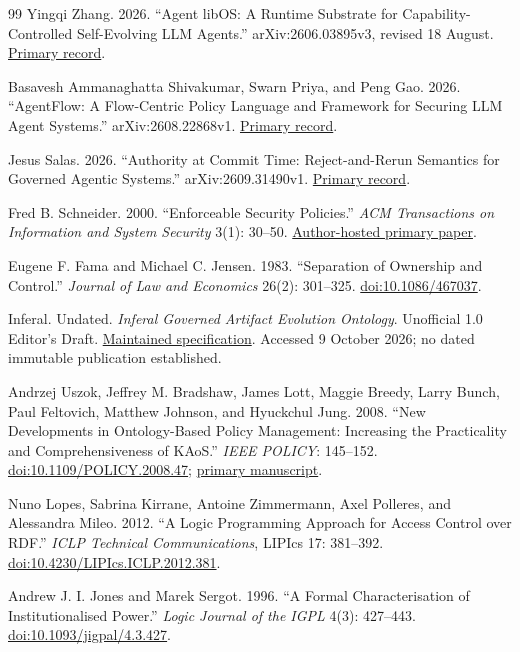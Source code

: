 \documentclass[
  english,
  12pt,
  a4paper,
  preprint,
  numbers,
  nopreprintline]{elsarticle}
\begin{document}
\begin{thebibliography}{99}
Yingqi Zhang. 2026. ``Agent libOS: A Runtime Substrate for
Capability-Controlled Self-Evolving LLM Agents.'' arXiv:2606.03895v3,
revised 18 August. \href{https://arxiv.org/abs/2606.03895v3}{Primary
record}.

Basavesh Ammanaghatta Shivakumar, Swarn Priya, and Peng Gao. 2026.
``AgentFlow: A Flow-Centric Policy Language and Framework for Securing
LLM Agent Systems.'' arXiv:2608.22868v1.
\href{https://arxiv.org/abs/2608.22868v1}{Primary record}.

Jesus Salas. 2026. ``Authority at Commit Time: Reject-and-Rerun
Semantics for Governed Agentic Systems.'' arXiv:2609.31490v1.
\href{https://arxiv.org/abs/2609.31490v1}{Primary record}.

Fred B. Schneider. 2000. ``Enforceable Security Policies.'' \emph{ACM
Transactions on Information and System Security} 3(1): 30--50.
\href{https://www.cs.cornell.edu/fbs/publications/EnfSecPols.pdf}{Author-hosted
primary paper}.

Eugene F. Fama and Michael C. Jensen. 1983. ``Separation of Ownership
and Control.'' \emph{Journal of Law and Economics} 26(2): 301--325.
\href{https://doi.org/10.1086/467037}{doi:10.1086/467037}.

Inferal. Undated. \emph{Inferal Governed Artifact Evolution Ontology}.
Unofficial 1.0 Editor's Draft.
\href{https://ontology.inferal.com/modules/artifact-evolution/spec/}{Maintained
specification}. Accessed 9 October 2026; no dated immutable publication
established.

Andrzej Uszok, Jeffrey M. Bradshaw, James Lott, Maggie Breedy, Larry
Bunch, Paul Feltovich, Matthew Johnson, and Hyuckchul Jung. 2008. ``New
Developments in Ontology-Based Policy Management: Increasing the
Practicality and Comprehensiveness of KAoS.'' \emph{IEEE POLICY}:
145--152.
\href{https://doi.org/10.1109/POLICY.2008.47}{doi:10.1109/POLICY.2008.47};
\href{https://ontology.ihmc.us/Papers/uszok_kaos_policy08.pdf}{primary
manuscript}.

Nuno Lopes, Sabrina Kirrane, Antoine Zimmermann, Axel Polleres, and
Alessandra Mileo. 2012. ``A Logic Programming Approach for Access
Control over RDF.'' \emph{ICLP Technical Communications}, LIPIcs 17:
381--392.
\href{https://doi.org/10.4230/LIPIcs.ICLP.2012.381}{doi:10.4230/LIPIcs.ICLP.2012.381}.

Andrew J. I. Jones and Marek Sergot. 1996. ``A Formal Characterisation
of Institutionalised Power.'' \emph{Logic Journal of the IGPL} 4(3):
427--443.
\href{https://doi.org/10.1093/jigpal/4.3.427}{doi:10.1093/jigpal/4.3.427}.


\end{thebibliography}
\end{document}
